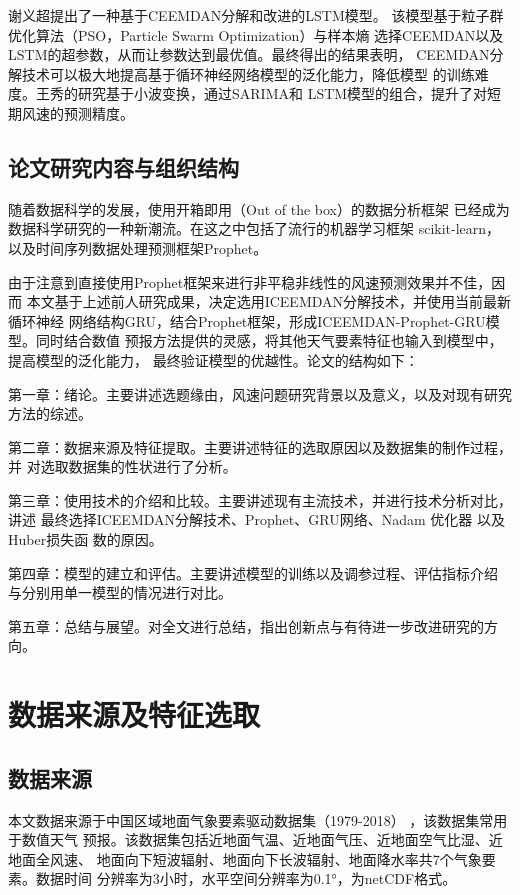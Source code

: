 \documentclass[AutoFakeBold]{LZUThesis}
\begin{document}
谢义超\cite{谢义超2021基于}提出了一种基于CEEMDAN分解和改进的LSTM模型。
该模型基于粒子群优化算法（PSO，Particle Swarm Optimization）与样本熵
选择CEEMDAN以及LSTM的超参数，从而让参数达到最优值。最终得出的结果表明，
CEEMDAN分解技术可以极大地提高基于循环神经网络模型的泛化能力，降低模型
的训练难度。王秀的研究\cite{王秀2021基于}基于小波变换，通过SARIMA和
LSTM模型的组合，提升了对短期风速的预测精度。

\section{论文研究内容与组织结构}

随着数据科学的发展，使用开箱即用（Out of the box）的数据分析框架
已经成为数据科学研究的一种新潮流。在这之中包括了流行的机器学习框架
scikit-learn，以及时间序列数据处理预测框架Prophet。

由于注意到直接使用Prophet框架来进行非平稳非线性的风速预测效果并不佳，因而
本文基于上述前人研究成果，决定选用ICEEMDAN分解技术，并使用当前最新循环神经
网络结构GRU，结合Prophet框架，形成ICEEMDAN-Prophet-GRU模型。同时结合数值
预报方法提供的灵感，将其他天气要素特征也输入到模型中，提高模型的泛化能力，
最终验证模型的优越性。论文的结构如下：

第一章：绪论。主要讲述选题缘由，风速问题研究背景以及意义，以及对现有研究
方法的综述。

第二章：数据来源及特征提取。主要讲述特征的选取原因以及数据集的制作过程，并
对选取数据集的性状进行了分析。

第三章：使用技术的介绍和比较。主要讲述现有主流技术，并进行技术分析对比，讲述
最终选择ICEEMDAN分解技术、Prophet、GRU网络、Nadam 优化器 以及 Huber损失函
数的原因。

第四章：模型的建立和评估。主要讲述模型的训练以及调参过程、评估指标介绍
与分别用单一模型的情况进行对比。

第五章：总结与展望。对全文进行总结，指出创新点与有待进一步改进研究的方向。




\chapter{数据来源及特征选取}
\section{数据来源}
本文数据来源于中国区域地面气象要素驱动数据集（1979-2018）
\cite{8028b944-daaa-4511-8769-965612652c49}，该数据集常用于数值天气
预报。该数据集包括近地面气温、近地面气压、近地面空气比湿、近地面全风速、
地面向下短波辐射、地面向下长波辐射、地面降水率共7个气象要素。数据时间
分辨率为3小时，水平空间分辨率为0.1°，为netCDF格式。
\cite{37cab0ac-d066-4fb9-aa9c-1cf50d601096}
\end{document}
